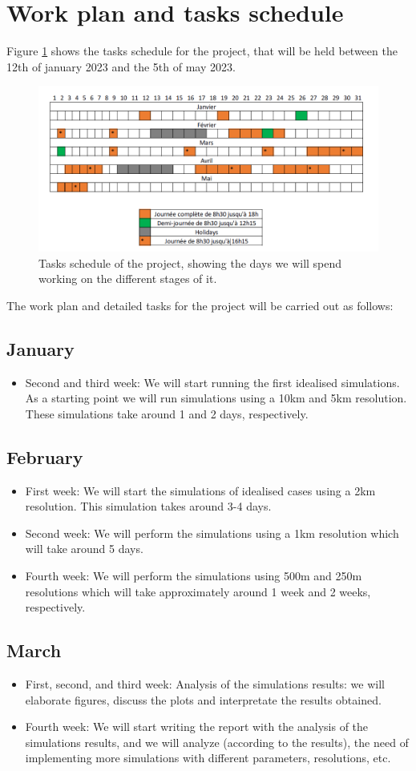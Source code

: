 \documentclass[a4paper,12pt]{article}
\begin{document}
\section{Work plan and tasks schedule}
Figure \ref{Schedule} shows the tasks schedule for the project, that will be held between the 12th of january 2023 and the 5th of may 2023. 
\begin{figure}[!h]
	\centering
	\includegraphics[width=0.7\linewidth]{../fig/Schedule}
	\caption{Tasks schedule of the project, showing the days we will spend working on the different stages of it.}
	\label{Schedule}
\end{figure}
The work plan and detailed tasks for the project will be carried out as follows:
\subsection{January}
\begin{itemize}
	\item Second and third week: We will start running the first idealised simulations. As a starting point we will run simulations using a 10km and 5km resolution. These simulations take around 1 and 2 days, respectively.
\end{itemize}
\subsection{February}
\begin{itemize}
	\item First week: We will start the simulations of idealised cases using a 2km resolution. This simulation takes around 3-4 days.
	\item Second week: We will perform the simulations using a 1km resolution which will take around 5 days.
	\item Fourth week: We will perform the simulations using 500m and 250m resolutions which will take approximately around 1 week and 2 weeks, respectively.
\end{itemize}
\subsection{March}
\begin{itemize}
	\item First, second, and third week: Analysis of the simulations results: we will elaborate figures, discuss the plots and interpretate the results obtained.
	\item Fourth week: We will start writing the report with the analysis of the simulations results, and we will analyze (according to the results), the need of implementing more simulations with different parameters, resolutions, etc.
\end{itemize}
\end{document}
